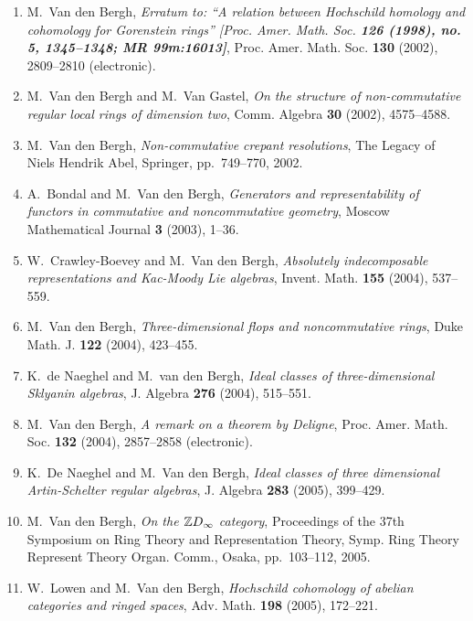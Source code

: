 \begin{enumerate}
\item
M.~Van den Bergh, {\em Erratum to: ``A relation between Hochschild homology and cohomology for Gorenstein rings'' [Proc. Amer. Math. Soc. \bf 126 (1998), no. 5, 1345--1348; MR 99m:16013]}, Proc. Amer. Math. Soc. {\bf 130} (2002), 2809--2810 (electronic).

\item
M.~Van den Bergh and M.~Van Gastel, {\em On the structure of non-commutative regular local rings of dimension two}, Comm. Algebra {\bf 30} (2002), 4575--4588.

\item
M.~Van den Bergh, {\em Non-commutative crepant resolutions}, The Legacy of Niels Hendrik Abel, Springer, pp.~749--770, 2002.

\item
A.~Bondal and M.~Van den Bergh, {\em Generators and representability of functors in commutative and noncommutative geometry}, Moscow Mathematical Journal {\bf 3} (2003), 1--36.

\item
W.~Crawley-Boevey and M.~Van den Bergh, {\em Absolutely indecomposable representations and Kac-Moody Lie algebras}, Invent. Math. {\bf 155} (2004), 537--559.

\item
M.~Van den Bergh, {\em Three-dimensional flops and noncommutative rings}, Duke Math. J. {\bf 122} (2004), 423--455.

\item
K.~de Naeghel and M.~van den Bergh, {\em Ideal classes of three-dimensional Sklyanin algebras}, J. Algebra {\bf 276} (2004), 515--551.

\item
M.~Van den Bergh, {\em A remark on a theorem by Deligne}, Proc. Amer. Math. Soc. {\bf 132} (2004), 2857--2858 (electronic).

\item
K.~De Naeghel and M.~Van den Bergh, {\em Ideal classes of three dimensional Artin-Schelter regular algebras}, J. Algebra {\bf 283} (2005), 399--429.

\item
M.~Van den Bergh, {\em On the ${\mathbb Z}D\sb \infty$ category}, Proceedings of the 37th Symposium on Ring Theory and Representation Theory, Symp. Ring Theory Represent Theory Organ. Comm., Osaka, pp.~103--112, 2005.

\item
W.~Lowen and M.~Van den Bergh, {\em Hochschild cohomology of abelian categories and ringed spaces}, Adv. Math. {\bf 198} (2005), 172--221.


\end{enumerate}

